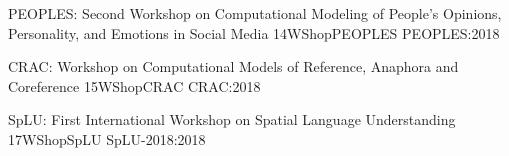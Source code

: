    \begin{wsschedule}
   {PEOPLES: Second Workshop on Computational Modeling of People's Opinions, Personality, and Emotions in Social Media}
   {14}{WShopPEOPLES}
   {PEOPLES:2018}
   {\WShopLocP}
   
 \end{wsschedule}

   \begin{wsschedule}
   {CRAC: Workshop on Computational Models of Reference, Anaphora and Coreference}
   {15}{WShopCRAC}
   {CRAC:2018}
   {\WShopLocP}
   
 \end{wsschedule}

 \begin{wsschedule}
   {SpLU: First International Workshop on Spatial Language Understanding}
   {17}{WShopSpLU}
{SpLU-2018:2018}
   {\WShopLocO}
   
 \end{wsschedule}



\clearpage{\thispagestyle{emptyheader}\cleardoublepage}
